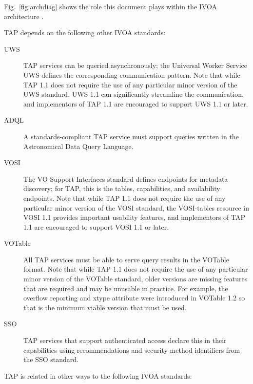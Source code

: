 \documentclass[11pt,letter]{ivoa}
\begin{document}
Fig.~\ref{fig:archdiag} shows the role this document plays within the
IVOA architecture \citep{note:VOARCH}.

TAP depends on the following other IVOA standards:

\begin{description}

\item[UWS \citep{2016ivoa.spec.1024H}] TAP services can be queried
asynchronously; the Universal Worker Service UWS defines the
corresponding communication pattern.  Note that while TAP 1.1 does not
require the use of any particular minor version of the UWS standard, 
UWS 1.1 can significantly streamline the communication, and
implementors of TAP 1.1 are encouraged to support UWS 1.1 or later.

\item[ADQL \citep{2008ivoa.spec.1030O}] A standards-compliant TAP
service must support queries written in the Astronomical Data Query
Language.

\item[VOSI \citep{2017ivoa.spec.0524G}] The VO Support Interfaces standard
defines endpoints for metadata discovery; for TAP, this is the tables,
capabilities, and availability endpoints. Note that while TAP 1.1 does not
require the use of any particular minor version of the VOSI standard, 
the VOSI-tables resource in VOSI 1.1 provides important usability features, and
implementors of TAP 1.1 are encouraged to support VOSI 1.1 or later.

\item[VOTable \citep{2013ivoa.spec.0920O}] All TAP services must be able
to serve query results in the VOTable format. Note that while TAP 1.1 does not
require the use of any particular minor version of the VOTable standard, older 
versions are missing features that are required and may be unusable in practice.
For example, the overflow reporting and xtype attribute were introduced in 
VOTable 1.2 so that is the minimum viable version that must be used.

\item[SSO \citep{2017ivoa.spec.0524T}] TAP services that support authenticated 
access declare this in their capabilities using recommendations and security method 
identifiers from the SSO standard.
\end{description}


TAP is related in other ways to the following IVOA standards:
\end{document}
